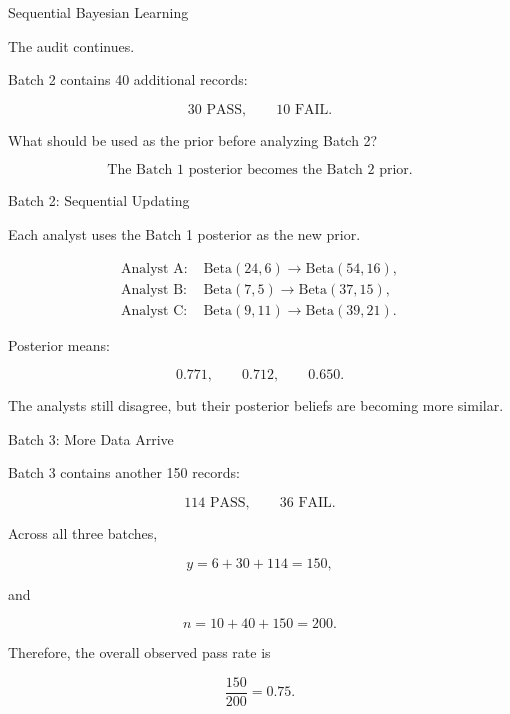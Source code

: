 \begin{frame}{Sequential Bayesian Learning}

The audit continues.

\vspace{0.35cm}

Batch 2 contains 40 additional records:

\[
30 \text{ PASS},
\qquad
10 \text{ FAIL}.
\]

\vspace{0.3cm}

What should be used as the prior before analyzing Batch 2?

\pause

\vspace{0.3cm}

\[
\boxed{
\text{The Batch 1 posterior becomes the Batch 2 prior.}
}
\]

\end{frame}

\begin{frame}{Batch 2: Sequential Updating}

Each analyst uses the Batch 1 posterior as the new prior.

\vspace{0.25cm}

\begin{align*}
\text{Analyst A: }&
\mathrm{Beta}(24,6)
\longrightarrow
\mathrm{Beta}(54,16),
\\[0.15cm]
\text{Analyst B: }&
\mathrm{Beta}(7,5)
\longrightarrow
\mathrm{Beta}(37,15),
\\[0.15cm]
\text{Analyst C: }&
\mathrm{Beta}(9,11)
\longrightarrow
\mathrm{Beta}(39,21).
\end{align*}

\vspace{0.25cm}

Posterior means:

\[
0.771,
\qquad
0.712,
\qquad
0.650.
\]

\vspace{0.2cm}

The analysts still disagree, but their posterior beliefs
are becoming more similar.

\end{frame}

\begin{frame}{Batch 3: More Data Arrive}

Batch 3 contains another 150 records:

\[
114 \text{ PASS},
\qquad
36 \text{ FAIL}.
\]

Across all three batches,

\[
y = 6+30+114 = 150,
\]

and

\[
n = 10+40+150 = 200.
\]

Therefore, the overall observed pass rate is

\[
\frac{150}{200}=0.75.
\]

\end{frame}

